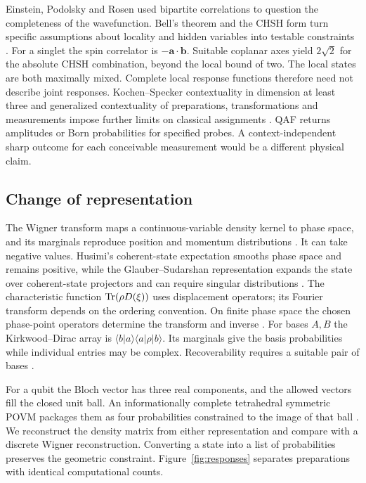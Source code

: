 Einstein, Podolsky and Rosen used bipartite correlations to question the completeness of the wavefunction. Bell's theorem and the CHSH form turn specific assumptions about locality and hidden variables into testable constraints \cite{epr,bell,chsh}. For a singlet the spin correlator is $-\mathbf a\cdot\mathbf b$. Suitable coplanar axes yield $2\sqrt 2$ for the absolute CHSH combination, beyond the local bound of two. The local states are both maximally mixed. Complete local response functions therefore need not describe joint responses. Kochen--Specker contextuality in dimension at least three and generalized contextuality of preparations, transformations and measurements impose further limits on classical assignments \cite{ks,spekkens,ptm}. QAF returns amplitudes or Born probabilities for specified probes. A context-independent sharp outcome for each conceivable measurement would be a different physical claim.

\subsection{Change of representation}
The Wigner transform maps a continuous-variable density kernel to phase space, and its marginals reproduce position and momentum distributions \cite{wigner}. It can take negative values. Husimi's coherent-state expectation smooths phase space and remains positive, while the Glauber--Sudarshan representation expands the state over coherent-state projectors and can require singular distributions \cite{husimi,glauber,sudarshan}. The characteristic function $\operatorname{Tr}(\rho D(\xi))$ uses displacement operators; its Fourier transform depends on the ordering convention. On finite phase space the chosen phase-point operators determine the transform and inverse \cite{wootters,frame}. For bases $A,B$ the Kirkwood--Dirac array is $\langle b|a\rangle\langle a|\rho|b\rangle$. Its marginals give the basis probabilities while individual entries may be complex. Recoverability requires a suitable pair of bases \cite{kd}.

For a qubit the Bloch vector has three real components, and the allowed vectors fill the closed unit ball. An informationally complete tetrahedral symmetric POVM packages them as four probabilities constrained to the image of that ball \cite{sic}. We reconstruct the density matrix from either representation and compare with a discrete Wigner reconstruction. Converting a state into a list of probabilities preserves the geometric constraint. Figure~\ref{fig:responses} separates preparations with identical computational counts.

